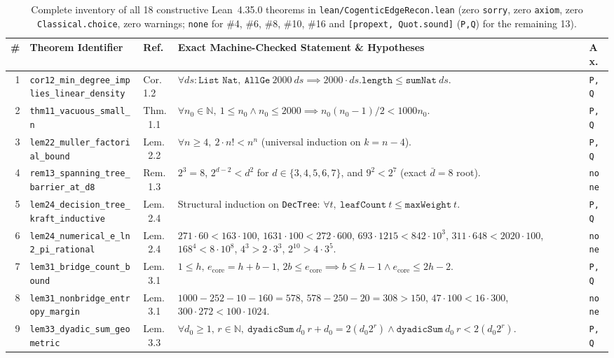 \documentclass[10pt,twocolumn]{article}
\newcommand{\NN}{\mathbb{N}}
\begin{document}
\begin{table}[t]
\centering
\caption{Complete inventory of all 18 constructive Lean~4.35.0 theorems in \nolinkurl{lean/CogenticEdgeRecon.lean} (zero \texttt{sorry}, zero \texttt{axiom}, zero \texttt{Classical.choice}, zero warnings; \texttt{none} for \#4, \#6, \#8, \#10, \#16 and \texttt{[propext, Quot.sound]} (\texttt{P,Q}) for the remaining 13).}
\label{tab:lean18}
\scriptsize
\setlength{\tabcolsep}{2.5pt}
\begin{tabular}{@{}r l l p{9.6cm} l@{}}
\toprule
\# & Theorem Identifier & Ref.~\cite{cogentic2026edgerecon} & Exact Machine-Checked Statement \& Hypotheses & Ax. \\
\midrule
1 & \texttt{cor12\_min\_degree\_implies\_linear\_density} & Cor.~1.2 & $\forall ds:\texttt{List Nat},\ \texttt{AllGe}\ 2000\ ds \implies 2000\cdot ds.\texttt{length}\le \texttt{sumNat}\ ds$. & \texttt{P,Q} \\
2 & \texttt{thm11\_vacuous\_small\_n} & Thm.~1.1 & $\forall n_0\in\NN,\ 1\le n_0 \wedge n_0\le 2000 \implies n_0(n_0-1)/2 < 1000 n_0$. & \texttt{P,Q} \\
3 & \texttt{lem22\_muller\_factorial\_bound} & Lem.~2.2 & $\forall n\ge 4,\ 2\cdot n! < n^n$ (universal induction on $k = n-4$). & \texttt{P,Q} \\
4 & \texttt{rem13\_spanning\_tree\_barrier\_at\_d8} & Rem.~1.3 & $2^3=8$, $2^{d-2}<d^2$ for $d\in\{3,4,5,6,7\}$, and $9^2<2^7$ (exact $\bar{d}=8$ root). & \texttt{none} \\
5 & \texttt{lem24\_decision\_tree\_kraft\_inductive} & Lem.~2.4 & Structural induction on \texttt{DecTree}: $\forall t,\ \texttt{leafCount}\ t \le \texttt{maxWeight}\ t$. & \texttt{P,Q} \\
6 & \texttt{lem24\_numerical\_e\_ln2\_pi\_rational} & Lem.~2.4 & $271{\cdot}60<163{\cdot}100$, $1631{\cdot}100<272{\cdot}600$, $693{\cdot}1215<842{\cdot}10^3$, $311{\cdot}648<2020{\cdot}100$, $168^4<8{\cdot}10^8$, $4^3>2{\cdot}3^3$, $2^{10}>4{\cdot}3^5$. & \texttt{none} \\
7 & \texttt{lem31\_bridge\_count\_bound} & Lem.~3.1 & $1\le h,\,e_{\mathrm{core}}=h+b-1,\,2b\le e_{\mathrm{core}} \implies b\le h-1 \wedge e_{\mathrm{core}}\le 2h-2$. & \texttt{P,Q} \\
8 & \texttt{lem31\_nonbridge\_entropy\_margin} & Lem.~3.1 & $1000{-}252{-}10{-}160=578$, $578{-}250{-}20=308>150$, $47{\cdot}100<16{\cdot}300$, $300{\cdot}272<100{\cdot}1024$. & \texttt{none} \\
9 & \texttt{lem33\_dyadic\_sum\_geometric} & Lem.~3.3 & $\forall d_0\ge 1,\,r\in\NN,\ \texttt{dyadicSum}\ d_0\ r + d_0 = 2(d_0 2^r) \wedge \texttt{dyadicSum}\ d_0\ r < 2(d_0 2^r)$. & \texttt{P,Q} \\

\end{tabular}
\end{table}
\end{document}
